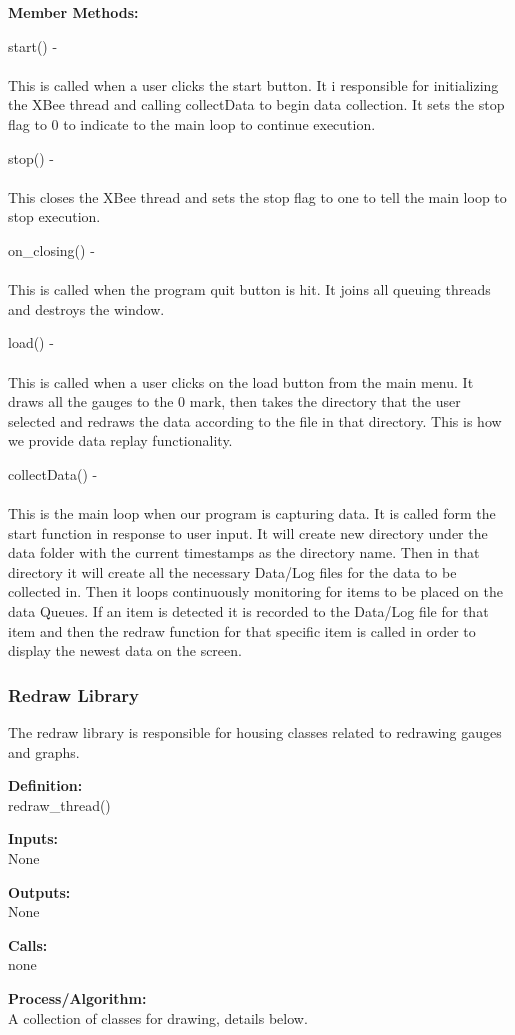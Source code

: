 \documentclass[10pt,draftclsnofoot,onecolumn,compsoc]{IEEEtran}
\begin{document}
{\bf Member Methods:} \par

start() - \\ \\
This is called when a user clicks the start button. It i responsible for initializing the XBee thread and calling collectData to begin data collection. It sets the stop flag to 0 to indicate to the main loop to continue execution. \par

stop() - \\ \\
This closes the XBee thread and sets the stop flag to one to tell the main loop to stop execution. \par

on\_closing() - \\ \\
This is called when the program quit button is hit. It joins all queuing threads and destroys the window. \par

load() - \\ \\
This is called when a user clicks on the load button from the main menu. It draws all the gauges to the 0 mark, then takes the directory that the user selected and redraws the data according to the file in that directory. This is how we provide data replay functionality.

collectData() - \\ \\
This is the main loop when our program is capturing data. It is called form the start function in response to user input. It will create new directory under the data folder with the current timestamps as the directory name. Then in that directory it will create all the necessary Data/Log files for the data to be collected in. Then it loops continuously monitoring for items to be placed on the data Queues. If an item is detected it is recorded to the Data/Log file for that item and then the redraw function for that specific item is called in order to display the newest data on the screen.

\subsubsection{Redraw Library}
The redraw library is responsible for housing classes related to redrawing gauges and graphs.\par
{\bf Definition:} \\
redraw\_thread() \par
{\bf Inputs:} \\  None \par
{\bf Outputs:} \\ None \par
{\bf Calls:} \\ none \par
{\bf Process/Algorithm:} \\
A collection of classes for drawing, details below.
\end{document}
